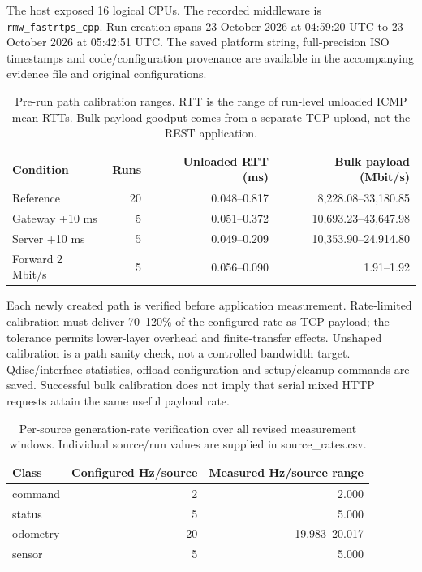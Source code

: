 The host exposed 16 logical CPUs. The recorded middleware is \texttt{rmw\_fastrtps\_cpp}. Run creation spans 23 October 2026 at 04:59:20 UTC to 23 October 2026 at 05:42:51 UTC. The saved platform string, full-precision ISO timestamps and code/configuration provenance are available in the accompanying evidence file and original configurations.

\begin{table}[H]
\centering\small
\setlength{\tabcolsep}{4pt}
\begin{tabular}{lrrr}
\hline
Condition & Runs & Unloaded RTT (ms) & Bulk payload (Mbit/s) \\
\hline
Reference & 20 & 0.048--0.817 & 8,228.08--33,180.85 \\
Gateway +10 ms & 5 & 0.051--0.372 & 10,693.23--43,647.98 \\
Server +10 ms & 5 & 0.049--0.209 & 10,353.90--24,914.80 \\
Forward 2 Mbit/s & 5 & 0.056--0.090 & 1.91--1.92 \\
\hline
\end{tabular}
\caption{Pre-run path calibration ranges. RTT is the range of run-level unloaded ICMP mean RTTs. Bulk payload goodput comes from a separate TCP upload, not the REST application.}
\label{tab:e1r-calibration}
\end{table}


Each newly created path is verified before application measurement. Rate-limited calibration must deliver 70--120\% of the configured rate as TCP payload; the tolerance permits lower-layer overhead and finite-transfer effects. Unshaped calibration is a path sanity check, not a controlled bandwidth target. Qdisc/interface statistics, offload configuration and setup/cleanup commands are saved. Successful bulk calibration does not imply that serial mixed HTTP requests attain the same useful payload rate.

\begin{table}[H]
\centering\small
\setlength{\tabcolsep}{4pt}
\begin{tabular}{lrr}
\hline
Class & Configured Hz/source & Measured Hz/source range \\
\hline
command & 2 & 2.000 \\
status & 5 & 5.000 \\
odometry & 20 & 19.983--20.017 \\
sensor & 5 & 5.000 \\
\hline
\end{tabular}
\caption{Per-source generation-rate verification over all revised measurement windows. Individual source/run values are supplied in source\_rates.csv.}
\label{tab:e1r-rates}
\end{table}


